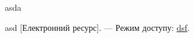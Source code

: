 \begin{thebibliography}    
    asda

    asd [Електронний ресурс]. --- Режим доступу: \url{dsf}.

 
\end{thebibliography}
